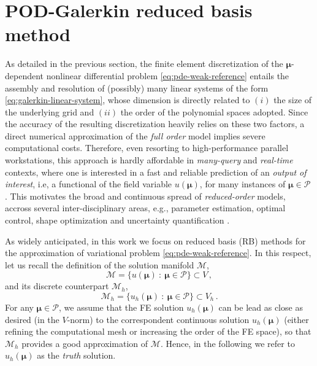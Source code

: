 \documentclass[12pt, a4paper, twoside, openright]{report}
\numberwithin{equation}{chapter}
\theoremstyle{theorem}
\theoremstyle{definition}
\theoremstyle{remark}
\theoremstyle{proposition}
\numberwithin{figure}{chapter}
\newcommand{\bg}[1]{\boldsymbol{#1}}
\begin{document}
	\vspace*{0.3cm}
		
	\section{POD-Galerkin reduced basis method}
	\label{section:POD-Galerkin reduced basis method}
		
		As detailed in the previous section, the finite element discretization of the $\bg{\mu}$-dependent nonlinear differential problem \eqref{eq:pde-weak-reference} entails the assembly and resolution of (possibly) many linear systems of the form \eqref{eq:galerkin-linear-system}, whose dimension is directly related to $(i)$ the size of the underlying grid and $(ii)$ the order of the polynomial spaces adopted. Since the accuracy of the resulting discretization heavily relies on these two factors, a direct numerical approximation of the \emph{full order} model implies severe computational costs. Therefore, even resorting to high-performance parallel workstations, this approach is hardly affordable in \emph{many-query} and \emph{real-time} contexts, where one is interested in a fast and reliable prediction of an \emph{output of interest}, i.e, a functional of the field variable $u(\bg{\mu})$, for many instances of $\bg{\mu} \in \mathcal{P}$ \cite{Dep08}. This motivates the broad and continuous spread of \emph{reduced-order} models, accross several inter-disciplinary areas, e.g., parameter estimation, optimal control, shape optimization and uncertainty quantification \cite{HSR16, QMN15}. 
		
		As widely anticipated, in this work we focus on reduced basis (RB) methods for the approximation of variational problem \eqref{eq:pde-weak-reference}. In this respect, let us recall the definition of the solution manifold $\mathcal{M}$,
		\begin{equation*}
			\mathcal{M} = \big\lbrace u(\bg{\mu}) ~ : ~ \bg{\mu} \in \mathcal{P} \big\rbrace \subset V \, ,
		\end{equation*}
		and its discrete counterpart $\mathcal{M}_h$,
		\begin{equation*}
			\mathcal{M}_h = \big\lbrace u_h(\bg{\mu}) ~ : ~ \bg{\mu} \in \mathcal{P} \big\rbrace \subset V_h \, .
		\end{equation*}
		For any $\bg{\mu} \in \mathcal{P}$, we assume that the FE solution $u_h(\bg{\mu})$ can be lead as close as desired (in the $V$-norm) to the correspondent continuous solution $u_h(\bg{\mu})$ (either refining the computational mesh or increasing the order of the FE space), so that $\mathcal{M}_h$ provides a good approximation of $\mathcal{M}$. Hence, in the following we refer to $u_h(\bg{\mu})$ as the \emph{truth} solution.
		
\end{document}
